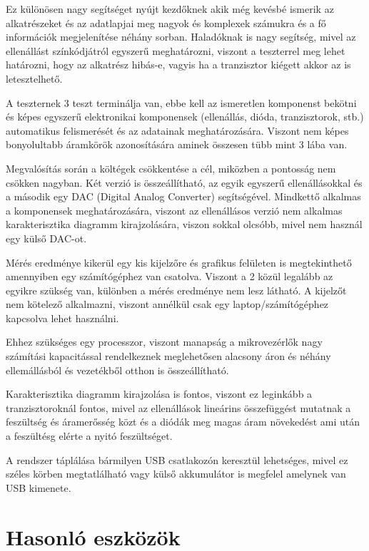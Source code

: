 Ez különösen nagy segítséget nyújt kezdőknek akik még kevésbé ismerik az alkatrészeket és az 
adatlapjai meg nagyok és komplexek számukra és a fő információk megjelenítése néhány sorban. 
Haladóknak is nagy segítség, mivel az ellenállást színkódjátról egyszerű meghatározni, viszont 
a teszterrel meg lehet határozni, hogy az alkatrész hibás-e, vagyis ha a tranzisztor kiégett 
akkor az is letesztelhető.

A teszternek 3 teszt terminálja van, ebbe kell az ismeretlen komponenst bekötni és képes 
egyszerű elektronikai komponensek (ellenállás, dióda, tranzisztorok, stb.) automatikus 
felismerését és az adatainak meghatározására. Viszont nem képes bonyolultabb áramkörök 
azonosítására aminek összesen tübb mint 3 lába van.

Megvalósítás során a költégek csökkentése a cél, miközben a pontosság nem csökken nagyban. 
Két verzió is összeállítható, az egyik egyszerű ellenállásokkal és a második egy DAC (Digital 
Analog Converter) segítségével. Mindkettő alkalmas a komponensek meghatározására, viszont az 
ellenállásos verzió nem alkalmas karakterisztika diagramm kirajzolására, viszon sokkal olcsóbb, 
mivel nem használ egy külső DAC-ot.

Mérés eredménye kikerül egy kis kijelzőre és grafikus felületen is megtekinthető amennyiben 
egy számítógéphez van csatolva. Viszont a 2 közül legalább az egyikre szükség van, különben a 
mérés eredménye nem lesz látható. A kijelzőt nem kötelező alkalmazni, viszont annélkül csak 
egy laptop/számítógéphez kapcsolva lehet használni.

Ehhez szükséges egy processzor, viszont manapság a mikrovezérlők nagy számítási kapacitással 
rendelkeznek meglehetősen alacsony áron és néhány ellemállásból és vezetékből otthon is 
összeállítható.

Karakterisztika diagramm kirajzolása is fontos, viszont ez leginkább a tranzisztoroknál 
fontos, mivel az ellenállások lineárins összefüggést mutatnak a feszültség és áramerősség közt 
és a diódák meg magas áram növekedést ami után a feszültésg elérte a nyitó feszültséget.

A rendszer táplálása bármilyen USB csatlakozón keresztül lehetséges, mivel ez széles körben 
megtatlálható vagy külső akkumulátor is megfelel amelynek van USB kimenete.

\section{Hasonló eszközök}

